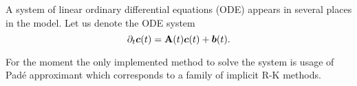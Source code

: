 A system of linear ordinary differential equations (ODE) appears in several places in the model. 
Let us denote the ODE system
\[
  \partial_t \mathbf{\boldsymbol{c}}(t) = \mathbf{A}(t) \mathbf{\boldsymbol{c}}(t) + \mathbf{\boldsymbol{b}}(t).
\]

For the moment the only implemented method to solve the system is usage of Pad\'e approximant which corresponds to a family
of implicit R-K methods.

% 
% 
% 
% 


